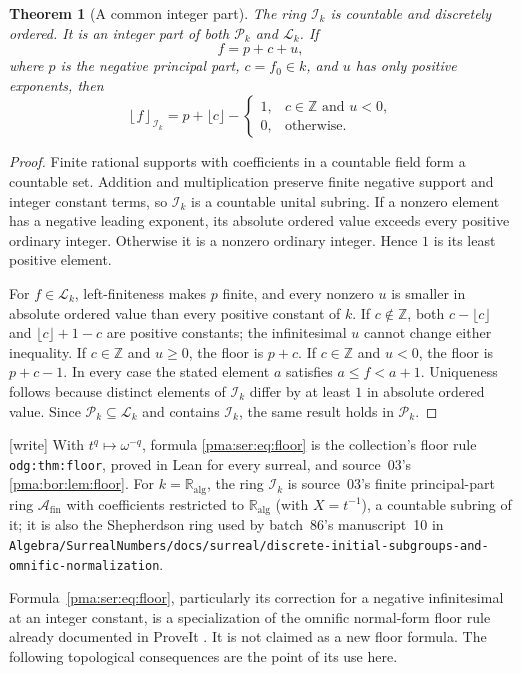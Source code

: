 \documentclass[11pt]{article}
\numberwithin{equation}{section}
\newtheorem{theorem}{Theorem}[section]
\theoremstyle{definition}
\theoremstyle{remark}
\newcommand{\Z}{\mathbb Z}
\newcommand{\A}{\mathcal A_{\mathrm{fin}}}
\newcommand{\writetag}{\textup{\textsf{\small[write]}}}
\newcommand{\replabel}[1]{\nolinkurl{#1}}
\newcommand{\fn}[1]{\nolinkurl{#1}}
\newcommand{\ka}{\mathbb R_{\mathrm{alg}}}
\newcommand{\Pk}{\mathcal P_k}
\newcommand{\Lk}{\mathcal L_k}
\newcommand{\Ik}{\mathcal I_k}
\newcommand{\floorI}[1]{\left\lfloor #1\right\rfloor_{\!\Ik}}
\begin{document}
\begin{theorem}[A common integer part]\label{pma:ser:thm:commonip}
The ring $\Ik$ is countable and discretely ordered. It is an integer part of
both $\Pk$ and $\Lk$. If
\[
 f=p+c+u,
\]
where $p$ is the negative principal part, $c=f_0\in k$, and $u$ has only
positive exponents, then
\begin{equation}\label{pma:ser:eq:floor}
 \floorI{f}
 =p+\lfloor c\rfloor-\begin{cases}
  1,&c\in\Z\text{ and }u<0,\\
  0,&\text{otherwise}.
 \end{cases}
\end{equation}
\end{theorem}
\begin{proof}
Finite rational supports with coefficients in a countable field form a
countable set. Addition and multiplication preserve finite negative support
and integer constant terms, so $\Ik$ is a countable unital subring.
If a nonzero element has a negative leading exponent, its absolute ordered
value exceeds every positive ordinary integer. Otherwise it is a nonzero
ordinary integer. Hence $1$ is its least positive element.

For $f\in\Lk$, left-finiteness makes $p$ finite, and every nonzero $u$ is
smaller in absolute ordered value than every positive constant of $k$.
If $c\notin\Z$, both $c-\lfloor c\rfloor$ and
$\lfloor c\rfloor+1-c$ are positive constants; the infinitesimal $u$
cannot change either inequality. If $c\in\Z$ and $u\geq0$, the floor is
$p+c$. If $c\in\Z$ and $u<0$, the floor is $p+c-1$.
In every case the stated element $a$ satisfies $a\leq f<a+1$.
Uniqueness follows because distinct elements of $\Ik$ differ by at least
$1$ in absolute ordered value. Since $\Pk\subseteq\Lk$ and contains
$\Ik$, the same result holds in $\Pk$.
\end{proof}

\noindent\writetag{} With $t^q\mapsto\omega^{-q}$, formula \eqref{pma:ser:eq:floor}
is the collection's floor rule \replabel{odg:thm:floor}, proved in Lean for
every surreal, and source~03's \cref{pma:bor:lem:floor}. For $k=\ka$, the
ring $\Ik$ is source~03's finite principal-part ring $\A$ with coefficients
restricted to $\ka$ (with $X=t^{-1}$), a countable subring of it; it is also
the Shepherdson ring used by batch~86's manuscript~10 in
\fn{Algebra/SurrealNumbers/docs/surreal/discrete-initial-subgroups-and-omnific-normalization}.

Formula~\eqref{pma:ser:eq:floor}, particularly its correction for a negative
infinitesimal at an integer constant, is a specialization of the omnific
normal-form floor rule already documented in ProveIt \cite{s09:ProveIt}.
It is not claimed as a new floor formula. The following topological
consequences are the point of its use here.
\end{document}
